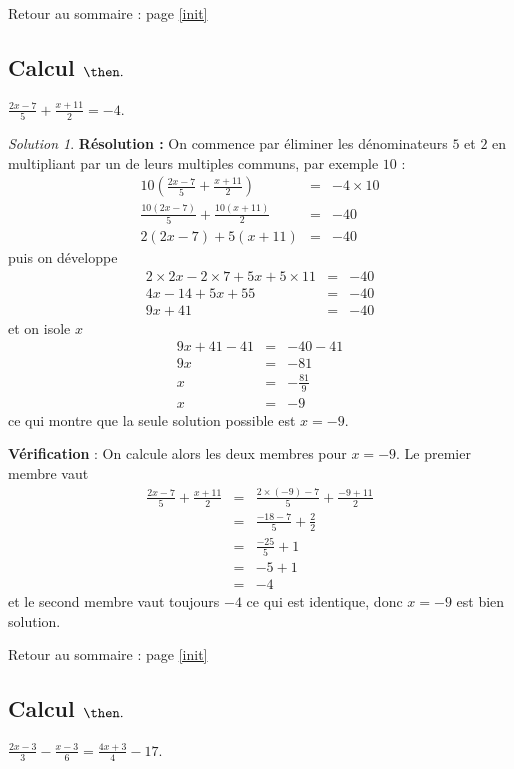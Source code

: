 \documentclass[14pt]{article}
\theoremstyle{remark}
\newtheorem*{sol}{Solution}
\newcounter{n}
\renewcommand{\it}{Retour au sommaire : page \ref{init}
	\subsection{Calcul $ \mathbf{ \then}.$}\label{\then} \stepcounter{n} }
\theoremstyle{plain}
\begin{document}
\it $\frac{2x-7}5 + \frac{x+11}2 = -4$. 
\begin{sol}
\textbf{Résolution :} On commence par éliminer les dénominateurs $5$ et $2$ en multipliant par un de leurs multiples communs, par exemple $10$ : 
\begin{eqnarray*}10\left(\frac{2x-7}5 + \frac{x+11}2\right) &=& -4\times 10 \\
\frac{10(2x-7)}5 + \frac{10(x+11)}2 &=& -40 \\
2(2x-7) + 5(x+11) &=& -40
\end{eqnarray*} puis on développe
\begin{eqnarray*} 
2\times 2x-2\times 7 + 5x+5\times 11 &=& -40\\
4x- 14 + 5x + 55 &=& -40\\
9x+41 &=& -40 
\end{eqnarray*}et on isole $x$
\begin{eqnarray*}9x+41-41 &=& -40-41 \\
9x&=&-81 \\
x&=& -\frac{81}9\\
x&=& -9
\end{eqnarray*}
ce qui montre que la seule solution possible est $x=-9$. 

\textbf{Vérification} : On calcule alors les deux membres pour $x=-9$. Le premier membre vaut 
\begin{eqnarray*}\frac{2x-7}5 + \frac{x+11}2
&=& \frac{2\times (-9)-7}5 + \frac{-9+11}2 \\
&=& \frac{-18-7}5 + \frac22 \\
&=& \frac{-25}5 + 1 \\
&=& -5+1\\
&=& -4
\end{eqnarray*}
et le second membre vaut toujours $-4$ ce qui est identique, donc $x=-9$ est bien solution.
\end{sol}
\it $\frac{2x-3}3 - \frac{x-3}6 = \frac{4x+3}4 - 17$. 
\end{document}
